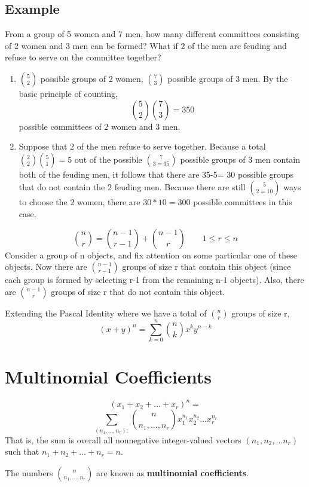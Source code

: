 \subsection{Example}
From a group of 5 women and 7 men, how many different committees consisting
of 2 women and 3 men can be formed? What if 2 of the men are feuding and
refuse to serve on the committee together?
\begin{enumerate}
    \item $5\choose 2$ possible groups of 2 women, $7\choose 3$ possible groups of 3 men. By the basic principle of counting, \[{5\choose 2}{7\choose 3} = 350\] possible committees of 2 women and 3 men.
    \item Suppose that 2 of the men refuse to serve together. Because a total ${2\choose 2}{5\choose 1} = 5$ out of the possible $7\choose 3 = 35$ possible groups of 3 men contain both of the feuding men, it follows that there are 35-5= 30 possible groups that do not contain the 2 feuding men. Because there are still $5\choose 2 = 10$ ways to choose the 2 women, there are $30*10 = 300$ possible committees in this case. 
\end{enumerate}
\begin{definition}
\[{{n}\choose {r}} = {{n-1}\choose {r-1}} + {{n-1}\choose {r}}\qquad 1\leq r\leq n\]
Consider a group of n objects, and fix attention on some particular one of these objects. Now there are ${n-1}\choose {r-1}$ groups of size r that contain this object (since each group is formed by selecting r-1 from the remaining n-1 objects). Also, there are ${n-1}\choose r$ groups of size r that do not contain this object. 
\end{definition}
\begin{theorem}
Extending the Pascal Identity where we have a total of $n\choose r$ groups of size r,
\[(x+y)^n = \sum_{k=0}^n {n\choose k} x^ky^{n-k}\]
\end{theorem}
\section{Multinomial Coefficients}
\begin{theorem}
    \[(x_1+x_2+\ldots+x_r)^n = \] \[\sum_{(n_1,...,n_r):} {n\choose{n_1,...,n_r}} x_1^{n_1}x_2^{n_2}\ldots x_r^{n_r}\]
    That is, the sum is overall all nonnegative integer-valued vectors $(n_1, n_2, \dots n_r)$ such that $n_1+n_2+\dots + n_r = n$.
\end{theorem}
The numbers ${n\choose{n_1,...,n_r}}$ are known as \textbf{multinomial coefficients}.

